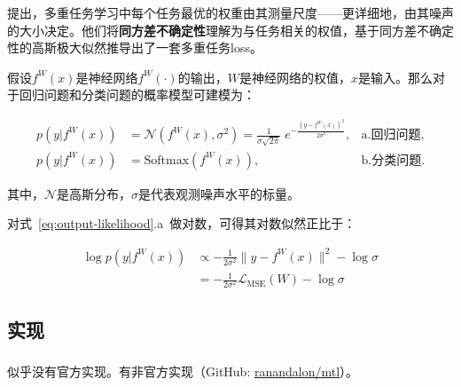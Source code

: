\documentclass[a4paper,punct]{ctexart}
\begin{document}
\subsubsection{}

\citet{Kendall18Uncertainty}提出，多重任务学习中每个任务最优的权重由其测量尺度——更详细地，由其噪声的大小决定。他们将\textbf{同方差不确定性}理解为与任务相关的权值，基于同方差不确定性的高斯极大似然推导出了一套多重任务loss。

假设$f^W(x)$是神经网络$f^W(\cdot)$的输出，$W$是神经网络的权值，$x$是输入。那么对于回归问题和分类问题的概率模型可建模为：

\begin{equation}
    \label{eq:output-likelihood}
    \begin{aligned}
        p(y|f^W(x)) &= \mathcal{N}(f^W(x), \sigma^2) = {\frac {1}{\sigma {\sqrt {2\pi }}}}\;e^{-{\frac {\left(y-f^W(x) \right)^{2}}{2\sigma ^{2}}}}, &\textrm{a.回归问题},\\
        p(y|f^W(x)) &= \mathrm{Softmax}(f^W(x)), &\textrm{b.分类问题}.
    \end{aligned}
\end{equation}

其中，$\mathcal{N}$是高斯分布，$\sigma$是代表观测噪声水平的标量。

对式~\ref{eq:output-likelihood}.a~做对数，可得其对数似然正比于：

\begin{equation}
    \begin{aligned}
        \log p(y|f^W(x)) &\propto - \frac{1}{2\sigma^2}\|y-f^W(x)\|^2 - \log \sigma \\
        &= -\frac{1}{2\sigma^2}\mathcal{L_\mathrm{MSE}}(W) - \log \sigma 
    \end{aligned}
\end{equation}

\subsection{实现}

\subsubsection{}

似乎没有官方实现。有非官方实现（GitHub: \href{https://github.com/ranandalon/mtl}{ranandalon/mtl}）。




\end{document}
